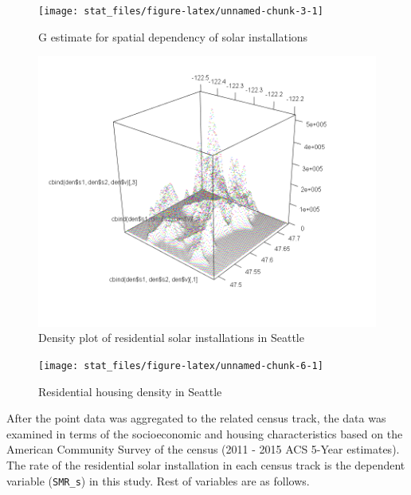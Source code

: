 \documentclass[11pt,]{article}
\begin{document}
\begin{figure}

{\centering \texttt{[image: stat\_files/figure-latex/unnamed-chunk-3-1]} 

}

\caption{G estimate for spatial dependency of solar installations}\label{fig:unnamed-chunk-3}
\end{figure}

\begin{figure}
\centering
\includegraphics[width=5.20833in,height=\textheight]{3d.png}
\caption{Density plot of residential solar installations in Seattle}
\end{figure}

\begin{figure}

{\centering \texttt{[image: stat\_files/figure-latex/unnamed-chunk-6-1]} 

}

\caption{Residential housing density in Seattle}\label{fig:unnamed-chunk-6}
\end{figure}

After the point data was aggregated to the related census track, the
data was examined in terms of the socioeconomic and housing
characteristics based on the American Community Survey of the census
(2011 - 2015 ACS 5-Year estimates). The rate of the residential solar
installation in each census track is the dependent variable
(\texttt{SMR\_s}) in this study. Rest of variables are as follows.
\end{document}
